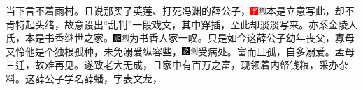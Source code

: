 当下言不着雨村。且说那买了英莲、打死冯渊的薛公子，{\includegraphics[width=3mm]{../Images/00002}\includegraphics[width=3mm]{../Images/00011}\footnotesize \kaishu 本是立意写此，却不肯特起头绪，故意设出``乱判''一段戏文，其中穿插，至此却淡淡写来。}亦系金陵人氏，本是书香继世之家。{\includegraphics[width=3mm]{../Images/00006}\includegraphics[width=3mm]{../Images/00011}\footnotesize \kaishu 为书香人家一叹。}只是如今这薛公子幼年丧父，寡母又怜他是个独根孤种，未免溺爱纵容些，{\includegraphics[width=3mm]{../Images/00006}\includegraphics[width=3mm]{../Images/00011}\footnotesize \kaishu 受病处。富而且孤，自多溺爱。孟母三迁，故难再见。}遂致老大无成，且家中有百万之富，现领着内帑钱粮，采办杂料。这薛公子学名薛蟠，字表文龙，